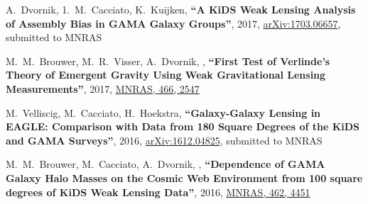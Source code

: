 \documentclass{article}
\def\myself{\textbf{\color{red} C.~Sif\'on}}
\def\mnras{MNRAS}
\newcommand{\submitted}[1]{submitted to #1}
\begin{document}
\vspace{-0.5cm}
\begin{etaremune}


\item
A.~Dvornik, 1.~M.~Cacciato, K.~Kuijken, 
\textbf{``A KiDS Weak Lensing Analysis of Assembly Bias in GAMA Galaxy Groups''},
2017, \href{http://adsabs.harvard.edu/abs/2017arXiv170306657D}{arXiv:1703.06657},
\submitted{\mnras}


\item
M.~M.~Brouwer, M.~R.~Visser, A.~Dvornik, ,
\textbf{``First Test of Verlinde's Theory of Emergent Gravity Using Weak 
Gravitational Lensing Measurements''},
2017, \href{http://adsabs.harvard.edu/abs/2017MNRAS.466.2547B}{\mnras, 466, 2547}


\item M.~Velliscig, M.~Cacciato, H.~Hoekstra, 
\textbf{``Galaxy-Galaxy Lensing in EAGLE: Comparison with Data from 180 Square
Degrees of the KiDS and GAMA Surveys''},
2016, \href{http://adsabs.harvard.edu/abs/2016arXiv161204825V}{arXiv:1612.04825},
\submitted{\mnras}


\item
M.~M.~Brouwer, M.~Cacciato, A.~Dvornik, ,
\textbf{``Dependence of GAMA Galaxy Halo Masses on the Cosmic Web Environment from 100 square degrees of KiDS Weak Lensing Data''},
2016, \href{http://adsabs.harvard.edu/abs/2016MNRAS.462.4451B}{\mnras, 462, 4451}



\end{etaremune}
\end{document}
